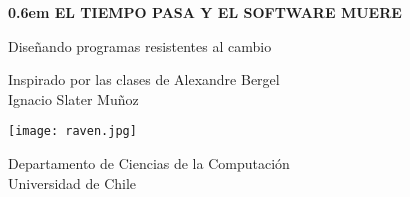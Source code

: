 \begin{titlepage}
  \clearpage
  \newcommand\nbvspace[1][3]{\vspace*{\stretch{#1}}}
  \newcommand\nbstretchyspace{\spaceskip0.5em plus 0.25em minus 0.25em}
  \newcommand{\nbtitlestretch}{\spaceskip0.6em}
  \pagestyle{empty}
  
  \begin{center}
    \bfseries
    \nbvspace[1]
    \Huge
    {
      \nbtitlestretch\huge
      EL TIEMPO PASA Y EL SOFTWARE MUERE
    }

    {\LARGE Diseñando programas resistentes al cambio}
    
    \nbvspace[1]
    \normalsize
    Inspirado por las clases de Alexandre Bergel
    \nbvspace[1]\\
    \Large Ignacio Slater Muñoz\\[0.5em]

    \nbvspace[2]

    \texttt{[image: raven.jpg]}
    \nbvspace[3]
    \normalsize

    Departamento de Ciencias de la Computación\\
    \large
    Universidad de Chile
    \nbvspace[1]
  \end{center}
\end{titlepage}